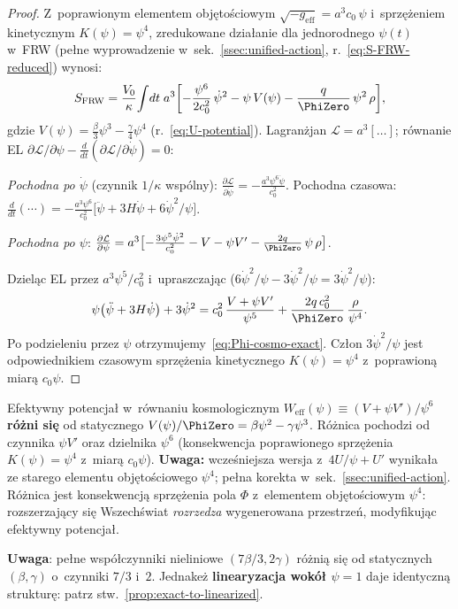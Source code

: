 \begin{proof}
Z~poprawionym elementem obj\k{e}to\'sciowym
$\sqrt{-g_{\mathrm{eff}}} = a^3 c_0\,\psi$
i~sprz\k{e}\.zeniem kinetycznym $K(\psi) = \psi^4$,
zredukowane dzia\l{}anie dla jednorodnego $\psi(t)$ w~FRW
(pe\l{}ne wyprowadzenie w~sek.~\ref{ssec:unified-action},
r.~\eqref{eq:S-FRW-reduced}) wynosi:
\[
  S_{\mathrm{FRW}} = \frac{V_0}{\kappa}\!\int\!dt\;a^3\biggl[
    -\frac{\psi^6}{2c_0^2}\,\dot\psi^2
    - \psi\,V(\psi)
    - \frac{q}{\PhiZero}\,\psi^2\,\rho
  \biggr],
\]
gdzie $V(\psi) = \frac{\beta}{3}\psi^3 - \frac{\gamma}{4}\psi^4$
(r.~\eqref{eq:U-potential}).
Lagran\.zjan $\mathcal{L} = a^3[\ldots]$; r\'ownanie EL
$\partial\mathcal{L}/\partial\psi
- \frac{d}{dt}(\partial\mathcal{L}/\partial\dot\psi) = 0$:

\emph{Pochodna po $\dot\psi$}
(czynnik $1/\kappa$ wsp\'olny):
$\frac{\partial\mathcal{L}}{\partial\dot\psi}
= -\frac{a^3\psi^6\dot\psi}{c_0^2}$.
Pochodna czasowa:
$\frac{d}{dt}(\cdots)
= -\frac{a^3\psi^6}{c_0^2}
\bigl[\ddot\psi + 3H\dot\psi + 6\dot\psi^2/\psi\bigr]$.

\emph{Pochodna po $\psi$}:
$\frac{\partial\mathcal{L}}{\partial\psi}
= a^3\bigl[
  -\frac{3\psi^5\dot\psi^2}{c_0^2}
  - V - \psi V'
  - \frac{2q}{\PhiZero}\,\psi\,\rho
\bigr]$.

Dziel\k{a}c EL przez $a^3\psi^5/c_0^2$ i~upraszczaj\k{a}c
($6\dot\psi^2/\psi - 3\dot\psi^2/\psi = 3\dot\psi^2/\psi$):
\[
  \psi\bigl(\ddot\psi + 3H\dot\psi\bigr) + 3\dot\psi^2
  = c_0^2\,\frac{V + \psi V'}{\psi^5}
  + \frac{2q\,c_0^2}{\PhiZero}\,\frac{\rho}{\psi^4}.
\]
Po podzieleniu przez $\psi$
otrzymujemy~\eqref{eq:Phi-cosmo-exact}.
Cz\l{}on $3\dot\psi^2/\psi$ jest odpowiednikiem
czasowym sprz\k{e}\.zenia kinetycznego $K(\psi)=\psi^4$
z~poprawion\k{a} miar\k{a} $c_0\psi$.
\end{proof}

\begin{remark}\label{rem:cosmo-vs-static}
Efektywny potencja\l{} w~r\'ownaniu kosmologicznym
$W_{\mathrm{eff}}(\psi) \equiv (V + \psi V')/\psi^6$
\textbf{r\'o\.zni si\k{e}} od statycznego
$V(\psi)/\PhiZero = \beta\psi^2 - \gamma\psi^3$.
R\'o\.znica pochodzi od czynnika $\psi V'$ oraz dzielnika $\psi^6$
(konsekwencja poprawionego sprz\k{e}\.zenia $K(\psi)=\psi^4$
z~miar\k{a} $c_0\psi$).
\textbf{Uwaga:} wcze\'sniejsza wersja z~$4U/\psi + U'$
wynika\l{}a ze starego elementu obj\k{e}to\'sciowego $\psi^4$;
pe\l{}na korekta w~sek.~\ref{ssec:unified-action}.
R\'o\.znica jest konsekwencj\k{a} sprz\k{e}\.zenia pola $\Phi$
z~elementem obj\k{e}to\'sciowym $\psi^4$: rozszerzaj\k{a}cy si\k{e}
Wszech\'swiat \emph{rozrzedza} wygenerowana przestrze\'n, modyfikuj\k{a}c
efektywny potencja\l{}.

\textbf{Uwaga}: pe\l{}ne wsp\'o\l{}czynniki nieliniowe
$(7\beta/3, 2\gamma)$ r\'o\.zni\k{a} si\k{e} od statycznych
$(\beta, \gamma)$ o~czynniki $7/3$ i~$2$.
Jednake\.z \textbf{linearyzacja wok\'o\l{} $\psi = 1$}
daje identyczn\k{a} struktur\k{e}: patrz
stw.~\ref{prop:exact-to-linearized}.
\end{remark}


